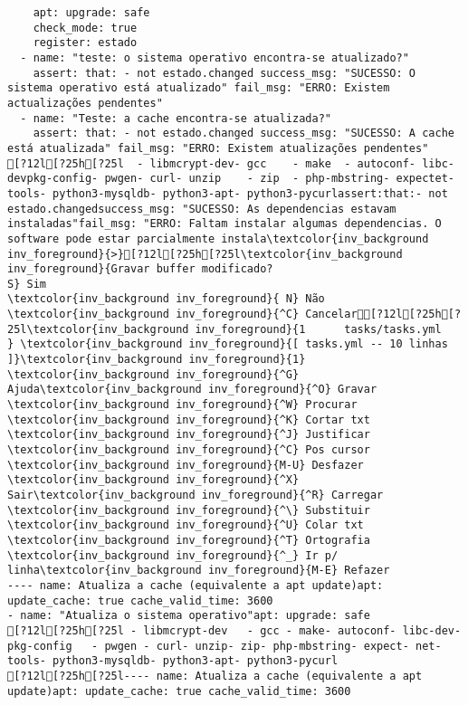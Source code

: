 \documentclass{scrartcl}
\begin{document}
\begin{Verbatim}
    apt: upgrade: safe
    check_mode: true
    register: estado
  - name: "teste: o sistema operativo encontra-se atualizado?"
    assert: that: - not estado.changed success_msg: "SUCESSO: O sistema operativo está atualizado" fail_msg: "ERRO: Existem actualizações pendentes"
  - name: "Teste: a cache encontra-se atualizada?"
    assert: that: - not estado.changed success_msg: "SUCESSO: A cache está atualizada" fail_msg: "ERRO: Existem atualizações pendentes"
[?12l[?25h[?25l  - libmcrypt-dev- gcc    - make  - autoconf- libc-devpkg-config- pwgen- curl- unzip    - zip  - php-mbstring- expectet-tools- python3-mysqldb- python3-apt- python3-pycurlassert:that:- not estado.changedsuccess_msg: "SUCESSO: As dependencias estavam instaladas"fail_msg: "ERRO: Faltam instalar algumas dependencias. O software pode estar parcialmente instala\textcolor{inv_background inv_foreground}{>}[?12l[?25h[?25l\textcolor{inv_background inv_foreground}{Gravar buffer modificado?                                                                                S} Sim
\textcolor{inv_background inv_foreground}{ N} Não          \textcolor{inv_background inv_foreground}{^C} Cancelar[?12l[?25h[?25l\textcolor{inv_background inv_foreground}{1      tasks/tasks.yml      } \textcolor{inv_background inv_foreground}{[ tasks.yml -- 10 linhas ]}\textcolor{inv_background inv_foreground}{1}
\textcolor{inv_background inv_foreground}{^G} Ajuda\textcolor{inv_background inv_foreground}{^O} Gravar     \textcolor{inv_background inv_foreground}{^W} Procurar   \textcolor{inv_background inv_foreground}{^K} Cortar txt \textcolor{inv_background inv_foreground}{^J} Justificar \textcolor{inv_background inv_foreground}{^C} Pos cursor \textcolor{inv_background inv_foreground}{M-U} Desfazer
\textcolor{inv_background inv_foreground}{^X} Sair\textcolor{inv_background inv_foreground}{^R} Carregar   \textcolor{inv_background inv_foreground}{^\} Substituir \textcolor{inv_background inv_foreground}{^U} Colar txt  \textcolor{inv_background inv_foreground}{^T} Ortografia \textcolor{inv_background inv_foreground}{^_} Ir p/ linha\textcolor{inv_background inv_foreground}{M-E} Refazer
---- name: Atualiza a cache (equivalente a apt update)apt: update_cache: true cache_valid_time: 3600
- name: "Atualiza o sistema operativo"apt: upgrade: safe
[?12l[?25h[?25l - libmcrypt-dev   - gcc - make- autoconf- libc-dev- pkg-config   - pwgen - curl- unzip- zip- php-mbstring- expect- net-tools- python3-mysqldb- python3-apt- python3-pycurl
[?12l[?25h[?25l---- name: Atualiza a cache (equivalente a apt update)apt: update_cache: true cache_valid_time: 3600

\end{Verbatim}
\end{document}
